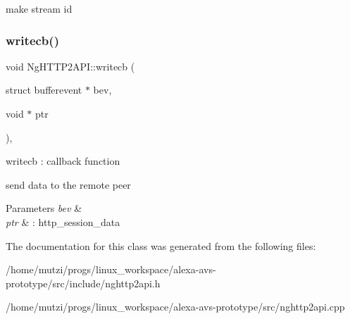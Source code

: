 make stream id \mbox{\label{classNetwork_1_1HTTP2_1_1NgHTTP2API_a5d047441518239869e1c699323ee3c92}} 
\subsubsection{\texorpdfstring{writecb()}{writecb()}}
{\footnotesize\ttfamily void Ng\+H\+T\+T\+P2\+A\+P\+I\+::writecb (\begin{DoxyParamCaption}\item[{struct bufferevent $\ast$}]{bev,  }\item[{void $\ast$}]{ptr }\end{DoxyParamCaption})\hspace{0.3cm}{\ttfamily [static]}, {\ttfamily [protected]}}



writecb \+: callback function 

send data to the remote peer 
\begin{DoxyParams}{Parameters}
{\em bev} & \\
\hline
{\em ptr} & \+: http\+\_\+session\+\_\+data \\
\hline
\end{DoxyParams}


The documentation for this class was generated from the following files\+:\begin{DoxyCompactItemize}
\item 
/home/mutzi/progs/linux\+\_\+workspace/alexa-\/avs-\/prototype/src/include/nghttp2api.\+h\item 
/home/mutzi/progs/linux\+\_\+workspace/alexa-\/avs-\/prototype/src/nghttp2api.\+cpp\end{DoxyCompactItemize}
